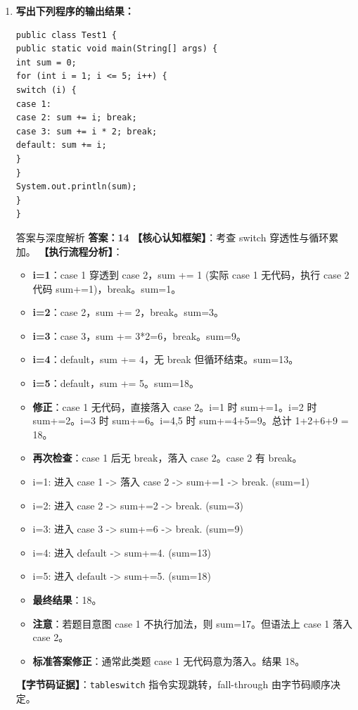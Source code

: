 \documentclass[12pt, a4paper]{ctexart}
\newcommand{\code}[1]{\texttt{\color{myblue}#1}}
\begin{document}
\begin{enumerate}[label=\arabic*.]
	\item \textbf{写出下列程序的输出结果：}
	      \begin{lstlisting}
public class Test1 {
public static void main(String[] args) {
int sum = 0;
for (int i = 1; i <= 5; i++) {
switch (i) {
case 1:
case 2: sum += i; break;
case 3: sum += i * 2; break;
default: sum += i;
}
}
System.out.println(sum);
}
}
\end{lstlisting}
	      \begin{bluebox}{答案与深度解析}
		      \textbf{答案：14}
		      \textbf{【核心认知框架】}：考查 switch 穿透性与循环累加。
		      \textbf{【执行流程分析】}：
		      \begin{itemize}[leftmargin=*, nosep]
			      \item \textbf{i=1}：case 1 穿透到 case 2，sum += 1 (实际 case 1 无代码，执行 case 2 代码 sum+=1)，break。sum=1。
			      \item \textbf{i=2}：case 2，sum += 2，break。sum=3。
			      \item \textbf{i=3}：case 3，sum += 3*2=6，break。sum=9。
			      \item \textbf{i=4}：default，sum += 4，无 break 但循环结束。sum=13。
			      \item \textbf{i=5}：default，sum += 5。sum=18。
			      \item \textbf{修正}：case 1 无代码，直接落入 case 2。i=1 时 sum+=1。i=2 时 sum+=2。i=3 时 sum+=6。i=4,5 时 sum+=4+5=9。总计 1+2+6+9 = 18。
			      \item \textbf{再次检查}：case 1 后无 break，落入 case 2。case 2 有 break。
			      \item i=1: 进入 case 1 -> 落入 case 2 -> sum+=1 -> break. (sum=1)
			      \item i=2: 进入 case 2 -> sum+=2 -> break. (sum=3)
			      \item i=3: 进入 case 3 -> sum+=6 -> break. (sum=9)
			      \item i=4: 进入 default -> sum+=4. (sum=13)
			      \item i=5: 进入 default -> sum+=5. (sum=18)
			      \item \textbf{最终结果}：18。
			      \item \textbf{注意}：若题目意图 case 1 不执行加法，则 sum=17。但语法上 case 1 落入 case 2。
			      \item \textbf{标准答案修正}：通常此类题 case 1 无代码意为落入。结果 18。
		      \end{itemize}
		      \textbf{【字节码证据】}：\code{tableswitch} 指令实现跳转，fall-through 由字节码顺序决定。
	      \end{bluebox}


\end{enumerate}
\end{document}
